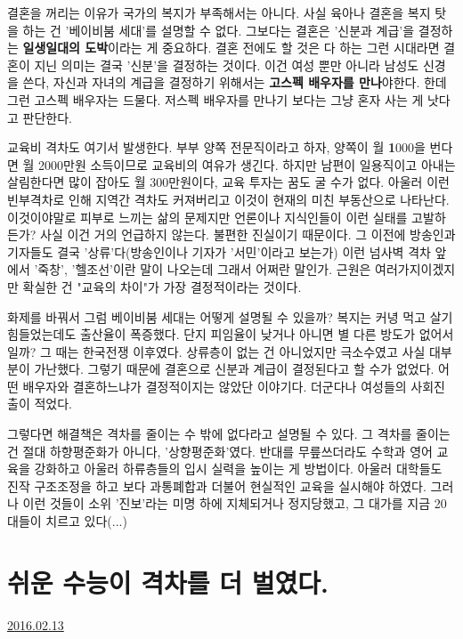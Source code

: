 결혼을 꺼리는 이유가 국가의 복지가 부족해서는 아니다. 사실 육아나 결혼을 복지 탓을 하는 건 '베이비붐 세대'를 설명할 수 없다.
그보다는 결혼은 '신분과 계급'을 결정하는 \textbf{일생일대의 도박}이라는 게 중요하다.
결혼 전에도 할 것은 다 하는 그런 시대라면 결혼이 지닌 의미는 결국 '신분'을 결정하는 것이다.
이건 여성 뿐만 아니라 남성도 신경을 쓴다, 자신과 자녀의 계급을 결정하기 위해서는 \textbf{고스펙 배우자를 만나}야한다.
한데 그런 고스펙 배우자는 드물다. 저스펙 배우자를 만나기 보다는 그냥 혼자 사는 게 낫다고 판단한다.
\vspace{5mm}

교육비 격차도 여기서 발생한다.
부부 양쪽 전문직이라고 하자, 양쪽이 월 \textbf{1}000을 번다면 월 2000만원 소득이므로 교육비의 여유가 생긴다.
하지만 남편이 일용직이고 아내는 살림한다면 많이 잡아도 월 300만원이다, 교육 투자는 꿈도 굴 수가 없다.
아울러 이런 빈부격차로 인해 지역간 격차도 커져버리고 이것이 현재의 미친 부동산으로 나타난다.
이것이야말로 피부로 느끼는 삶의 문제지만 언론이나 지식인들이 이런 실태를 고발하든가?
사실 이건 거의 언급하지 않는다. 불편한 진실이기 때문이다.
그 이전에 방송인과 기자들도 결국 '상류'다(방송인이나 기자가 '서민'이라고 보는가)
이런 넘사벽 격차 앞에서 '죽창', '헬조선'이란 말이 나오는데 그래서 어쩌란 말인가.
근원은 여러가지이겠지만 확실한 건 "교육의 차이"가 가장 결정적이라는 것이다.
\vspace{5mm}

화제를 바꿔서 그럼 베이비붐 세대는 어떻게 설명될 수 있을까?
복지는 커녕 먹고 살기 힘들었는데도 출산율이 폭증했다. 단지 피임율이 낮거나 아니면 별 다른 방도가 없어서일까?
그 때는 한국전쟁 이후였다. 상류층이 없는 건 아니었지만 극소수였고 사실 대부분이 가난했다.
그렇기 때문에 결혼으로 신분과 계급이 결정된다고 할 수가 없었다.
어떤 배우자와 결혼하느냐가 결정적이지는 않았단 이야기다. 더군다나 여성들의 사회진출이 적었다.
\vspace{5mm}

그렇다면 해결책은 격차를 줄이는 수 밖에 없다라고 설명될 수 있다.
그 격차를 줄이는 건 절대 하향평준화가 아니다, '상향평준화'였다.
반대를 무릎쓰더라도 수학과 영어 교육을 강화하고 아울러 하류층들의 입시 실력을 높이는 게 방법이다.
아울러 대학들도 진작 구조조정을 하고 보다 과통폐합과 더불어 현실적인 교육을 실시해야 하였다.
그러나 이런 것들이 소위 '진보'라는 미명 하에 지체되거나 정지당했고, 그 대가를 지금 20대들이 치르고 있다(...)






\section{쉬운 수능이 격차를 더 벌였다.}
\href{https://www.kockoc.com/Apoc/633865}{2016.02.13}

